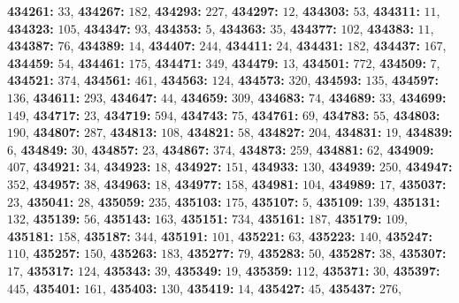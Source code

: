 \textsf{\bfseries 434261:} $33$, \textsf{\bfseries 434267:} $182$, \textsf{\bfseries 434293:} $227$, \textsf{\bfseries 434297:} $12$, \textsf{\bfseries 434303:} $53$, \textsf{\bfseries 434311:} $11$, \textsf{\bfseries 434323:} $105$, \textsf{\bfseries 434347:} $93$, \textsf{\bfseries 434353:} $5$, \textsf{\bfseries 434363:} $35$, \textsf{\bfseries 434377:} $102$, \textsf{\bfseries 434383:} $11$, \textsf{\bfseries 434387:} $76$, \textsf{\bfseries 434389:} $14$, \textsf{\bfseries 434407:} $244$, \textsf{\bfseries 434411:} $24$, \textsf{\bfseries 434431:} $182$, \textsf{\bfseries 434437:} $167$, \textsf{\bfseries 434459:} $54$, \textsf{\bfseries 434461:} $175$, \textsf{\bfseries 434471:} $349$, \textsf{\bfseries 434479:} $13$, \textsf{\bfseries 434501:} $772$, \textsf{\bfseries 434509:} $7$, \textsf{\bfseries 434521:} $374$, \textsf{\bfseries 434561:} $461$, \textsf{\bfseries 434563:} $124$, \textsf{\bfseries 434573:} $320$, \textsf{\bfseries 434593:} $135$, \textsf{\bfseries 434597:} $136$, \textsf{\bfseries 434611:} $293$, \textsf{\bfseries 434647:} $44$, \textsf{\bfseries 434659:} $309$, \textsf{\bfseries 434683:} $74$, \textsf{\bfseries 434689:} $33$, \textsf{\bfseries 434699:} $149$, \textsf{\bfseries 434717:} $23$, \textsf{\bfseries 434719:} $594$, \textsf{\bfseries 434743:} $75$, \textsf{\bfseries 434761:} $69$, \textsf{\bfseries 434783:} $55$, \textsf{\bfseries 434803:} $190$, \textsf{\bfseries 434807:} $287$, \textsf{\bfseries 434813:} $108$, \textsf{\bfseries 434821:} $58$, \textsf{\bfseries 434827:} $204$, \textsf{\bfseries 434831:} $19$, \textsf{\bfseries 434839:} $6$, \textsf{\bfseries 434849:} $30$, \textsf{\bfseries 434857:} $23$, \textsf{\bfseries 434867:} $374$, \textsf{\bfseries 434873:} $259$, \textsf{\bfseries 434881:} $62$, \textsf{\bfseries 434909:} $407$, \textsf{\bfseries 434921:} $34$, \textsf{\bfseries 434923:} $18$, \textsf{\bfseries 434927:} $151$, \textsf{\bfseries 434933:} $130$, \textsf{\bfseries 434939:} $250$, \textsf{\bfseries 434947:} $352$, \textsf{\bfseries 434957:} $38$, \textsf{\bfseries 434963:} $18$, \textsf{\bfseries 434977:} $158$, \textsf{\bfseries 434981:} $104$, \textsf{\bfseries 434989:} $17$, \textsf{\bfseries 435037:} $23$, \textsf{\bfseries 435041:} $28$, \textsf{\bfseries 435059:} $235$, \textsf{\bfseries 435103:} $175$, \textsf{\bfseries 435107:} $5$, \textsf{\bfseries 435109:} $139$, \textsf{\bfseries 435131:} $132$, \textsf{\bfseries 435139:} $56$, \textsf{\bfseries 435143:} $163$, \textsf{\bfseries 435151:} $734$, \textsf{\bfseries 435161:} $187$, \textsf{\bfseries 435179:} $109$, \textsf{\bfseries 435181:} $158$, \textsf{\bfseries 435187:} $344$, \textsf{\bfseries 435191:} $101$, \textsf{\bfseries 435221:} $63$, \textsf{\bfseries 435223:} $140$, \textsf{\bfseries 435247:} $110$, \textsf{\bfseries 435257:} $150$, \textsf{\bfseries 435263:} $183$, \textsf{\bfseries 435277:} $79$, \textsf{\bfseries 435283:} $50$, \textsf{\bfseries 435287:} $38$, \textsf{\bfseries 435307:} $17$, \textsf{\bfseries 435317:} $124$, \textsf{\bfseries 435343:} $39$, \textsf{\bfseries 435349:} $19$, \textsf{\bfseries 435359:} $112$, \textsf{\bfseries 435371:} $30$, \textsf{\bfseries 435397:} $445$, \textsf{\bfseries 435401:} $161$, \textsf{\bfseries 435403:} $130$, \textsf{\bfseries 435419:} $14$, \textsf{\bfseries 435427:} $45$, \textsf{\bfseries 435437:} $276$, 
